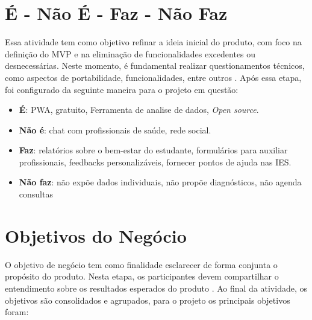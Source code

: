 \section{É - Não É - Faz - Não Faz}

Essa atividade tem como objetivo refinar a ideia inicial do produto, com foco na definição do MVP e na eliminação de funcionalidades excedentes ou desnecessárias. Neste momento, é fundamental realizar questionamentos técnicos, como aspectos de portabilidade, funcionalidades, entre outros \cite{caroli2017lean}. Após essa etapa, foi configurado da seguinte maneira para o projeto em questão:

\begin{itemize}

    \item \textbf{É}: PWA, gratuito, Ferramenta de analise de dados, \textit{Open source}.

    \item \textbf{Não é}: chat com profissionais de saúde, rede social.

    \item \textbf{Faz}: relatórios sobre o bem-estar do estudante, formulários para auxiliar profissionais, feedbacks personalizáveis, fornecer pontos de ajuda nas IES.

    \item \textbf{Não faz}: não expõe dados individuais, não propõe diagnósticos, não agenda consultas

\end{itemize}

\section{Objetivos do Negócio}

O objetivo de negócio tem como finalidade esclarecer de forma conjunta o propósito do produto. Nesta etapa, os participantes devem compartilhar o entendimento sobre os resultados esperados do produto \cite{caroli2017lean}. Ao final da atividade, os objetivos são consolidados e agrupados, para o projeto os principais objetivos foram:

